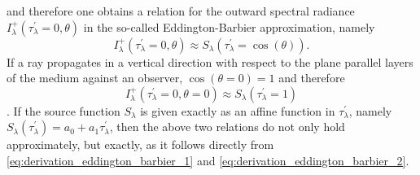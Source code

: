 \documentclass[a4paper,12pt]{report}
\def\lk#1{{\color{black}{#1}}}
\begin{document}
\begin{align}
\begin{aligned}
\end{aligned}\end{align} and therefore one obtains a relation for the outward spectral radiance $I_\lambda^+(\tau_\lambda^\prime = 0,\theta)$ in the so-called Eddington-Barbier approximation, namely \begin{equation}
I_\lambda^+(\tau_\lambda^\prime = 0,\theta) \approx S_\lambda(\tau_\lambda^\prime = \cos(\theta)).
\end{equation} If a ray propagates in a vertical direction with respect to the plane parallel layers of the medium against an observer, $\cos(\theta=0) = 1$ and therefore \begin{equation}
I_\lambda^+(\tau_\lambda^\prime = 0, \theta=0) \approx S_\lambda(\tau_\lambda^\prime = 1)
\end{equation} \lk{holds}. If the source function $S_\lambda$ is given exactly as an affine function in $\tau_\lambda^\prime$, namely $S_\lambda(\tau_\lambda^\prime) = a_0 + a_1\tau_\lambda^\prime$, then the above two relations do not only hold approximately, but exactly, as it follows directly from \cref{eq:derivation_eddington_barbier_1} and \cref{eq:derivation_eddington_barbier_2}.
\end{document}
